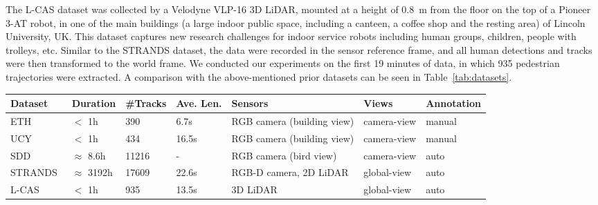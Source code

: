 \documentclass[letterpaper, 10 pt, conference]{ieeeconf}  %
\newcommand\kevinupdate[1]{\textcolor{black}{#1}}
\begin{document}

The L-CAS dataset was collected by a Velodyne VLP-16 3D LiDAR, mounted at a height of 0.8~m from the floor on the top of a Pioneer 3-AT robot, in one of the main buildings (a large indoor public space, including a canteen, a coffee shop and the resting area) of Lincoln University, UK.
This dataset captures new research challenges for indoor service robots including human groups, children, people with trolleys, etc.
Similar to the STRANDS dataset, the data were recorded in the sensor reference frame, and all human detections and tracks were then transformed to the world frame.
We conducted our experiments on the first 19 minutes of data, in which 935 pedestrian trajectories were extracted.
A comparison with the above-mentioned prior datasets can be seen in Table~\ref{tab:datasets}.


\begin{table*}[t]
\centering
\caption{Comparison of the existing datasets for pedestrian trajectory prediction}
\label{tab:datasets}
\begin{tabular}{|l|l|l|l|l|l|l|}
\hline
Dataset & Duration & \#Tracks & Ave. Len. & Sensors & Views & Annotation\\
\hline
ETH~\cite{ETH} & $<$ 1h & 390 & 6.7s & RGB camera (building view) & camera-view & manual \\
\hline
UCY~\cite{UCY} & $<$ 1h & 434 & 16.5s & RGB camera (building view) & camera-view & manual \\
\hline
SDD~\cite{SDD} & $\approx$ 8.6h & 11216 & - & RGB camera (bird view) & camera-view & auto \\
\hline
STRANDS~\cite{Hawes2016} & $\approx$ 3192h & 17609 & 22.6s & RGB-D camera, 2D LiDAR & global-view & auto  \\
\hline
L-CAS~\cite{yz17iros} & $<$ 1h & 935 & 13.5s & 3D LiDAR & global-view & auto \\
\hline
\end{tabular}
\end{table*}
\end{document}
